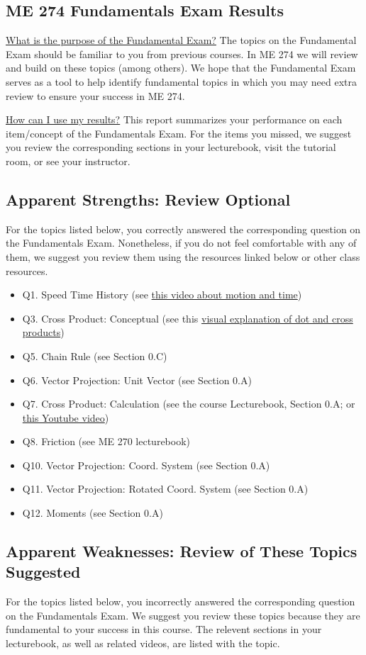 \documentclass[11pt,letterpaper]{article}\usepackage[]{graphicx}\usepackage[]{color}
\begin{document}
\subsection*{ME 274 Fundamentals Exam Results}
\underline{What is the purpose of the Fundamental Exam?}  The topics on the Fundamental Exam should be familiar to you from previous courses.  In ME 274 we will review and build on these topics (among others). We hope that the Fundamental Exam serves as a tool to help identify fundamental topics in which you may need extra review to ensure your success in ME 274.\

\underline{How can I use my results?}  This report summarizes your performance on each item/concept of the Fundamentals Exam.  For the items you missed, we suggest you review the corresponding sections in your lecturebook, visit the tutorial room, or see your instructor.

\subsection*{Apparent Strengths: Review Optional}
For the topics listed below, you correctly answered the corresponding question on the Fundamentals Exam.  Nonetheless, if you do not feel comfortable with any of them, we suggest you review them using the resources linked below or other class resources.

\begin{itemize}\item Q1. Speed Time History (see \href{https://www.youtube.com/watch?v=lZPtFDXYQRU}{this video about motion and time})
\item Q3. Cross Product: Conceptual (see this \href{https://www.youtube.com/watch?v=h0NJK4mEIJU&t=8s}{visual explanation of dot and cross products})
\item Q5. Chain Rule (see Section 0.C)
\item Q6. Vector Projection: Unit Vector (see Section 0.A)
\item Q7. Cross Product: Calculation (see the course Lecturebook, Section 0.A; or \href{https://www.youtube.com/watch?v=DmPxjmymM7k}{this Youtube video})
\item Q8. Friction (see ME 270 lecturebook)
\item Q10. Vector Projection: Coord. System (see Section 0.A)
\item Q11. Vector Projection: Rotated Coord. System (see Section 0.A)
\item Q12. Moments (see Section 0.A)
\end{itemize}\subsection*{Apparent Weaknesses: Review of These Topics Suggested}
For the topics listed below, you incorrectly answered the corresponding question on the Fundamentals Exam.  We suggest you review these topics because they are fundamental to your success in this course.  The relevent sections in your lecturebook, as well as related videos, are listed with the topic.
\end{document}
